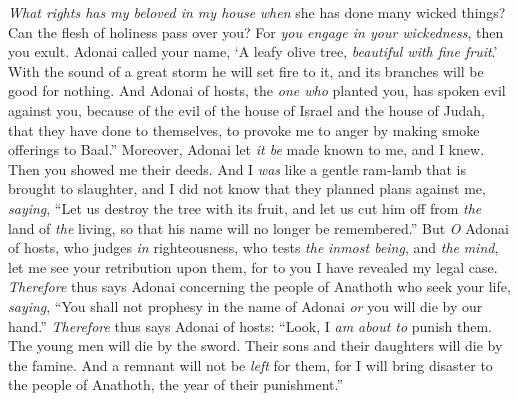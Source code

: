 \begin{biblechapter}
\verse \textit{What rights has my beloved in my house} 
\textit{when} she has done many wicked things? 
Can the flesh of holiness pass over you? 
For \textit{you engage in your wickedness}, then you exult.
\verse Adonai called your name, ‘A leafy olive tree, \textit{beautiful with fine fruit}.’ 
With the sound of a great storm he will set fire to it, 
and its branches will be good for nothing.
\verse And Adonai of hosts, the \textit{one who} planted you, 
has spoken evil against you, 
because of the evil of the house of Israel and the house of Judah, 
that they have done to themselves, 
to provoke me to anger by making smoke offerings to Baal.”
 Moreover, Adonai let \textit{it be} made known to me, and I knew. 
Then you showed me their deeds.
\verse And I \textit{was} like a gentle ram-lamb that is brought to slaughter, 
and I did not know that they planned plans against me, \textit{saying}, 
“Let us destroy the tree with its fruit, 
and let us cut him off from \textit{the} land of \textit{the} living, 
so that his name will no longer be remembered.”
\verse But \textit{O} Adonai of hosts, who judges \textit{in} righteousness, 
who tests \textit{the} \textit{inmost being}, and \textit{the} \textit{mind}, 
let me see your retribution upon them, 
for to you I have revealed my legal case.
\verse \textit{Therefore} thus says Adonai concerning the people of Anathoth who seek your life, \textit{saying}, “You shall not prophesy in the name of Adonai \textit{or} you will die by our hand.”
\verse \textit{Therefore} thus says Adonai of hosts: “Look, I \textit{am about to} punish them. The young men will die by the sword. Their sons and their daughters will die by the famine.
\verse And a remnant will not be \textit{left} for them, for I will bring disaster to the people of Anathoth, the year of their punishment.”
\end{biblechapter}

